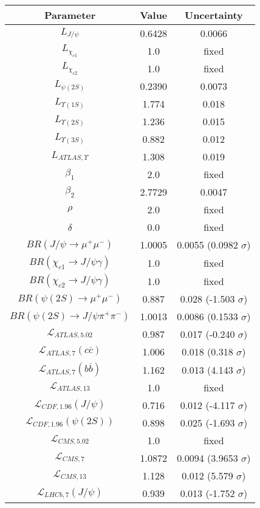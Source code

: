 \begin{table}[h!]
\centering
\begin{tabular}{c|c|c}
Parameter & Value & Uncertainty \\
\hline
$L_{J/\psi}$ & 0.6428 & 0.0066 \\
$L_{\chi_{c1}}$ & 1.0 & fixed \\
$L_{\chi_{c2}}$ & 1.0 & fixed \\
$L_{\psi(2S)}$ & 0.2390 & 0.0073 \\
$L_{\Upsilon(1S)}$ & 1.774 & 0.018 \\
$L_{\Upsilon(2S)}$ & 1.236 & 0.015 \\
$L_{\Upsilon(3S)}$ & 0.882 & 0.012 \\
$L_{ATLAS,\Upsilon}$ & 1.308 & 0.019 \\
$\beta_1$ & 2.0 & fixed \\
$\beta_2$ & 2.7729 & 0.0047 \\
$\rho$ & 2.0 & fixed \\
$\delta$ & 0.0 & fixed \\
$BR(J/\psi\rightarrow\mu^+\mu^-)$ & 1.0005 & 0.0055 (0.0982 $\sigma$) \\
$BR(\chi_{c1}\rightarrow J/\psi\gamma)$ & 1.0 & fixed \\
$BR(\chi_{c2}\rightarrow J/\psi\gamma)$ & 1.0 & fixed \\
$BR(\psi(2S)\rightarrow\mu^+\mu^-)$ & 0.887 & 0.028 (-1.503 $\sigma$) \\
$BR(\psi(2S)\rightarrow J/\psi\pi^+\pi^-)$ & 1.0013 & 0.0086 (0.1533 $\sigma$) \\
$\mathcal L_{ATLAS,5.02}$ & 0.987 & 0.017 (-0.240 $\sigma$) \\
$\mathcal L_{ATLAS,7}(c\overline c)$ & 1.006 & 0.018 (0.318 $\sigma$) \\
$\mathcal L_{ATLAS,7}(b\overline b)$ & 1.162 & 0.013 (4.143 $\sigma$) \\
$\mathcal L_{ATLAS,13}$ & 1.0 & fixed \\
$\mathcal L_{CDF,1.96}(J/\psi)$ & 0.716 & 0.012 (-4.117 $\sigma$) \\
$\mathcal L_{CDF,1.96}(\psi(2S))$ & 0.898 & 0.025 (-1.693 $\sigma$) \\
$\mathcal L_{CMS,5.02}$ & 1.0 & fixed \\
$\mathcal L_{CMS,7}$ & 1.0872 & 0.0094 (3.9653 $\sigma$) \\
$\mathcal L_{CMS,13}$ & 1.128 & 0.012 (5.579 $\sigma$) \\
$\mathcal L_{LHCb,7}(J/\psi)$ & 0.939 & 0.013 (-1.752 $\sigma$) \\

\end{tabular}
\end{table}
